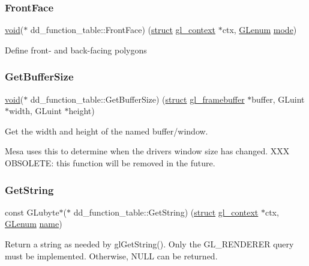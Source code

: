 \subsubsection{\texorpdfstring{Front\+Face}{FrontFace}}
{\footnotesize\ttfamily \hyperlink{interfacevoid}{void}($\ast$ dd\+\_\+function\+\_\+table\+::\+Front\+Face) (\hyperlink{interfacestruct}{struct} \hyperlink{structgl__context}{gl\+\_\+context} $\ast$ctx, \hyperlink{interfacevoid}{G\+Lenum} \hyperlink{interfacevoid}{mode})}

Define front-\/ and back-\/facing polygons \mbox{\label{structdd__function__table_a8453cd558af6878530ab7a88a21ee64c}} 
\subsubsection{\texorpdfstring{Get\+Buffer\+Size}{GetBufferSize}}
{\footnotesize\ttfamily \hyperlink{interfacevoid}{void}($\ast$ dd\+\_\+function\+\_\+table\+::\+Get\+Buffer\+Size) (\hyperlink{interfacestruct}{struct} \hyperlink{structgl__framebuffer}{gl\+\_\+framebuffer} $\ast$buffer, G\+Luint $\ast$width, G\+Luint $\ast$height)}

Get the width and height of the named buffer/window.

Mesa uses this to determine when the driver\textquotesingle{}s window size has changed. X\+XX O\+B\+S\+O\+L\+E\+TE\+: this function will be removed in the future. \mbox{\label{structdd__function__table_a9806da3e2614187f5e154ffada409570}} 
\subsubsection{\texorpdfstring{Get\+String}{GetString}}
{\footnotesize\ttfamily const G\+Lubyte$\ast$($\ast$ dd\+\_\+function\+\_\+table\+::\+Get\+String) (\hyperlink{interfacestruct}{struct} \hyperlink{structgl__context}{gl\+\_\+context} $\ast$ctx, \hyperlink{interfacevoid}{G\+Lenum} \hyperlink{structname}{name})}

Return a string as needed by gl\+Get\+String(). Only the G\+L\+\_\+\+R\+E\+N\+D\+E\+R\+ER query must be implemented. Otherwise, N\+U\+LL can be returned. \mbox{\label{structdd__function__table_a0b9a6f027a3472d9ca293bf3e7a703cd}} 
